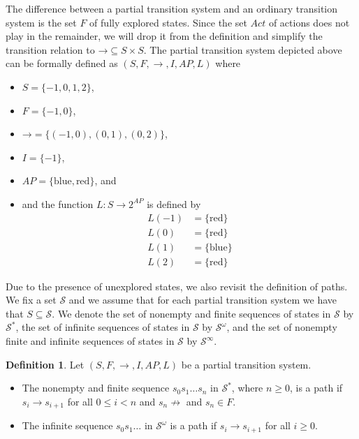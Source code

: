 \documentclass[12pt]{article}
\theoremstyle{definition}
\newtheorem{definition}{Definition}
\begin{document}
The difference between a partial transition system and an ordinary transition system is the set $F$ of fully explored states.  Since the set $\mathit{Act}$ of actions does not play in the remainder, we will drop it from the definition and simplify the transition relation to $\mathord{\rightarrow} \subseteq S \times S$. The partial transition system depicted above can be formally defined as $(S, F, \rightarrow, I, \mathit{AP}, L)$ where
\begin{itemize}
\item 
$S = \{ -1, 0, 1, 2 \}$,
\item
$F = \{ -1, 0 \}$,
\item
$\mathord{\rightarrow} = \{ (-1, 0), (0, 1), (0, 2) \}$,
\item
$I = \{ -1 \}$,
\item
$\mathit{AP} = \{ \mbox{blue}, \mbox{red} \}$, and
\item
and the function $L : S \to 2^{\mathit{AP}}$ is defined by
\begin{align*}
L(-1) & = \{ \mbox{red} \}\\
L(0) & = \{ \mbox{red} \}\\
L(1) & = \{ \mbox{blue} \}\\
L(2) & = \{ \mbox{red} \}
\end{align*}
\end{itemize} 

\color{red}
Due to the presence of unexplored states, we also revisit the definition of paths.  We fix a set $\mathcal{S}$ and we assume that for each partial transition system we have that $S \subseteq \mathcal{S}$.  We denote the set of nonempty and finite sequences of states in $\mathcal{S}$ by $\mathcal{S}^*$, the set of infinite sequences of states in $\mathcal{S}$ by $\mathcal{S}^{\omega}$, and the set of nonempty finite and infinite sequences of states in $\mathcal{S}$ by $\mathcal{S}^{\infty}$.

\begin{definition}
Let $(S, F, \rightarrow, I, \mathit{AP}, L)$ be a partial transition system.
\begin{itemize}
\item 
The nonempty and finite sequence $s_0 s_1 \ldots s_n$ in $\mathcal{S}^*$, where $n \geq 0$, is a path if $s_i \rightarrow s_{i+1}$ for all $0 \leq i < n$ and $s_n \not\rightarrow$ and $s_n \in F$.
\item 
The infinite sequence $s_0 s_1 \ldots$ in $\mathcal{S}^{\omega}$ is a path if $s_i \rightarrow s_{i+1}$ for all $i \geq 0$. 
\end{itemize}
\end{definition}
\end{document}
